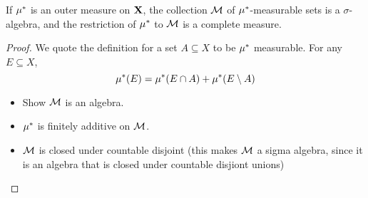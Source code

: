 \documentclass[../../main.tex]{subfiles}
\begin{document}
\begin{wts}
    If $\mu^*$ is an outer measure on ${\mathbf{X}}$, the collection $\mathcal{M}$ of $\mu^*$-measurable sets is a $\sigma$-algebra, and the restriction of $\mu^*$ to $\mathcal{M}$ is a complete measure.
\end{wts}
\begin{proof}
    We quote the definition for a set $A\subseteq X$ to be $\mu^*$ measurable. For any $E\subseteq X$, 
    \begin{equation}\label{def:mustar-measurable}
        \mu^*(E) = \mu^*(E\cap A) + \mu^*(E\setminus A)
    \end{equation}
    
    \begin{itemize}
        \item Show $\mathcal{M}$ is an algebra.
        \item $\mu^*$ is finitely additive on $\mathcal{M}$.
        \item $\mathcal{M}$ is closed under countable disjoint (this makes $\mathcal{M}$ a sigma algebra, since it is an algebra that is closed under countable disjiont unions)
    \end{itemize}


\end{proof}
\end{document}
